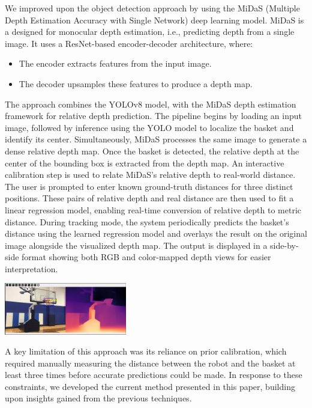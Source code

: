 \documentclass[a4paper]{article}
\begin{document}
\begin{multicols}{2}
\par \noindent
We improved upon the object detection approach by using the MiDaS (Multiple Depth Estimation Accuracy with Single Network) deep learning model. MiDaS is a designed for monocular depth estimation, i.e., predicting depth from a single image. It uses a ResNet-based encoder-decoder architecture, where:
\begin{itemize}
    \item The encoder extracts features from the input image.
    \item The decoder upsamples these features to produce a depth map.
\end{itemize}
The approach combines the YOLOv8 model, with the MiDaS depth estimation framework for relative depth prediction.
The pipeline begins by loading an input image, followed by inference using the YOLO model to localize the basket and identify its center. Simultaneously, MiDaS processes the same image to generate a dense relative depth map. Once the basket is detected, the relative depth at the center of the bounding box is extracted from the depth map.
An interactive calibration step is used to relate MiDaS's relative depth to real-world distance. The user is prompted to enter known ground-truth distances for three distinct positions. These pairs of relative depth and real distance are then used to fit a linear regression model, enabling real-time conversion of relative depth to metric distance.
During tracking mode, the system periodically predicts the basket's distance using the learned regression model and overlays the result on the original image alongside the visualized depth map. The output is displayed in a side-by-side format showing both RGB and color-mapped depth views for easier interpretation.

{ \centering
  \includegraphics[width=0.4\textwidth]{../results/midas.png}\\
  \label{fig:basket_midas}
}

A key limitation of this approach was its reliance on prior calibration, which required manually measuring the distance between the robot and the basket at least three times before accurate predictions could be made. In response to these constraints, we developed the current method presented in this paper, building upon insights gained from the previous techniques.


\end{multicols}
\end{document}
